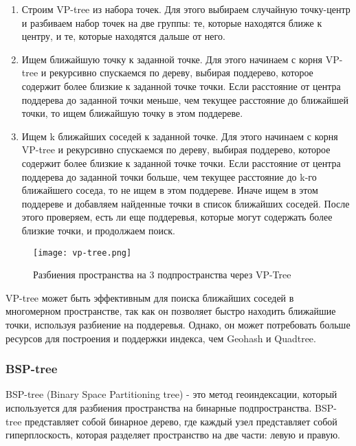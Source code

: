 \begin{enumerate}
    \item Строим VP-tree из набора точек. Для этого выбираем случайную точку-центр и разбиваем набор точек на две группы: те, которые находятся ближе к центру, и те, которые находятся дальше от него.
    \item Ищем ближайшую точку к заданной точке. Для этого начинаем с корня VP-tree и рекурсивно спускаемся по дереву, выбирая поддерево, которое содержит более близкие к заданной точке точки. Если расстояние от центра поддерева до заданной точки меньше, чем текущее расстояние до ближайшей точки, то ищем ближайшую точку в этом поддереве.
    \item Ищем k ближайших соседей к заданной точке. Для этого начинаем с корня VP-tree и рекурсивно спускаемся по дереву, выбирая поддерево, которое содержит более близкие к заданной точке точки. Если расстояние от центра поддерева до заданной точки больше, чем текущее расстояние до k-го ближайшего соседа, то не ищем в этом поддереве. Иначе ищем в этом поддереве и добавляем найденные точки в список ближайших соседей. После этого проверяем, есть ли еще поддеревья, которые могут содержать более близкие точки, и продолжаем поиск.
\end{enumerate}

\begin{figure}[h]
    \centering
    \texttt{[image: vp-tree.png]}
    \caption{Разбиения пространства на 3 подпространства через VP-Tree}
\end{figure}

VP-tree может быть эффективным для поиска ближайших соседей в многомерном пространстве, так как он позволяет быстро находить ближайшие точки, используя разбиение на поддеревья. Однако, он может потребовать больше ресурсов для построения и поддержки индекса, чем Geohash и Quadtree.

\subsubsection{BSP-tree}
BSP-tree (Binary Space Partitioning tree) - это метод геоиндексации, который используется для разбиения пространства на бинарные подпространства. BSP-tree представляет собой бинарное дерево, где каждый узел представляет собой гиперплоскость, которая разделяет пространство на две части: левую и правую.


